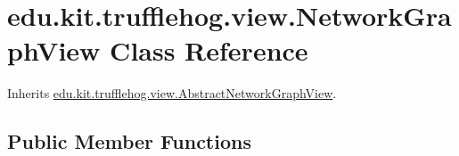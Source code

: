 \hypertarget{classedu_1_1kit_1_1trufflehog_1_1view_1_1_network_graph_view}{}\section{edu.\+kit.\+trufflehog.\+view.\+Network\+Graph\+View Class Reference}
\label{classedu_1_1kit_1_1trufflehog_1_1view_1_1_network_graph_view}


Inherits \hyperlink{classedu_1_1kit_1_1trufflehog_1_1view_1_1_abstract_network_graph_view}{edu.\+kit.\+trufflehog.\+view.\+Abstract\+Network\+Graph\+View}.

\subsection*{Public Member Functions}

